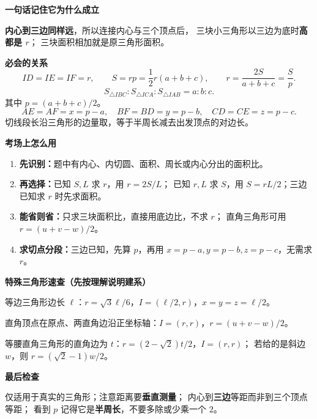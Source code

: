 \begin{summarybox}
\textbf{\textcolor{CSummary}{一句话记住它为什么成立}}

\textbf{内心到三边同样远}，所以连接内心与三个顶点后，
三块小三角形以三边为底时\textbf{高都是 $r$}；
三块面积相加就是原三角形面积。

\medskip
\textbf{\textcolor{CSummary}{必会的关系}}
\[
\boxed{ID=IE=IF=r},\qquad
\boxed{S=rp=\frac12r(a+b+c)},
\qquad \boxed{r=\frac{2S}{a+b+c}=\frac Sp}.
\]
\[
\boxed{S_{\triangle IBC}:S_{\triangle ICA}:S_{\triangle IAB}=a:b:c}.
\]
其中 $p=(a+b+c)/2$。
\[
\boxed{AE=AF=x=p-a},\quad
\boxed{BF=BD=y=p-b},\quad
\boxed{CD=CE=z=p-c}.
\]
切线段长沿三角形的边量取，等于半周长减去出发顶点的对边长。

\medskip
\textbf{\textcolor{CSummary}{考场上怎么用}}
\begin{enumerate}[leftmargin=*,itemsep=0.35em]
 \item \textbf{先识别：}题中有内心、内切圆、面积、周长或内心分出的面积比。
 \item \textbf{再选择：}已知 $S,L$ 求 $r$，用 $r=2S/L$；
 已知 $r,L$ 求 $S$，用 $S=rL/2$；三边已知求 $r$ 时先求面积。
 \item \textbf{能省则省：}只求三块面积比，直接用底边比，不求 $r$；
 直角三角形可用 $r=(u+v-w)/2$。
 \item \textbf{求切点分段：}三边已知，先算 $p$，再用 $x=p-a,y=p-b,z=p-c$，无需求 $r$。
\end{enumerate}

\medskip
\textbf{\textcolor{CSummary}{特殊三角形速查（先按理解说明建系）}}

等边三角形边长 $\ell$：$r=\sqrt3\ell/6$，$I=(\ell/2,r)$，$x=y=z=\ell/2$。

直角顶点在原点、两直角边沿正坐标轴：$I=(r,r)$，$r=(u+v-w)/2$。

等腰直角三角形的直角边为 $t$：$r=(2-\sqrt2)t/2$，$I=(r,r)$；
若给的是斜边 $w$，则 $r=(\sqrt2-1)w/2$。

\medskip
\textbf{\textcolor{CSummary}{最后检查}}

仅适用于真实的三角形；注意距离要\textbf{垂直测量}；
内心到\textbf{三边}等距而非到三个顶点等距；
看到 $p$ 记得它是\textbf{半周长}，不要多除或少乘一个 $2$。
\end{summarybox}
